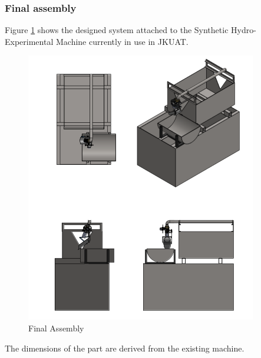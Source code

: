 \subsubsection{Final assembly}
Figure \ref{fig:final assembly} shows the designed system attached to the Synthetic Hydro-Experimental Machine currently in use in JKUAT.
\begin{figure}[H]
    \centering
    \includegraphics[width=\textwidth,height=0.75\textheight,keepaspectratio]{Figures/final assembly.png}
    \caption{Final Assembly}
    \label{fig:final assembly}
\end{figure}
 The dimensions of the part are derived from the existing machine.
 
